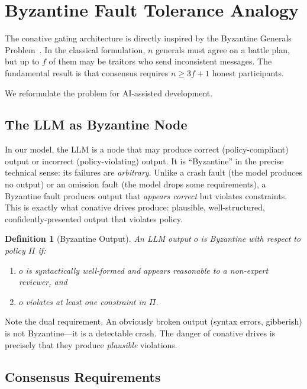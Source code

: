 \documentclass[11pt,a4paper]{article}
\newtheorem{definition}{Definition}[section]
\begin{document}
\section{Byzantine Fault Tolerance Analogy}
\label{sec:byzantine}

The conative gating architecture is directly inspired by the
Byzantine Generals Problem~\citep{lamport1982byzantine}.  In the
classical formulation, $n$ generals must agree on a battle plan,
but up to $f$ of them may be traitors who send inconsistent messages.
The fundamental result is that consensus requires $n \geq 3f + 1$
honest participants.

We reformulate the problem for AI-assisted development.

\subsection{The LLM as Byzantine Node}

In our model, the LLM is a node that may produce correct
(policy-compliant) output or incorrect (policy-violating) output.
It is ``Byzantine'' in the precise technical sense: its failures
are \emph{arbitrary}.  Unlike a crash fault (the model produces no
output) or an omission fault (the model drops some requirements),
a Byzantine fault produces output that \emph{appears correct} but
violates constraints.  This is exactly what conative drives produce:
plausible, well-structured, confidently-presented output that
violates policy.

\begin{definition}[Byzantine Output]
An LLM output $o$ is \emph{Byzantine} with respect to policy $\Pi$ if:
\begin{enumerate}
  \item $o$ is syntactically well-formed and appears reasonable to
        a non-expert reviewer, and
  \item $o$ violates at least one constraint in $\Pi$.
\end{enumerate}
\end{definition}

Note the dual requirement.  An obviously broken output (syntax errors,
gibberish) is not Byzantine---it is a detectable crash.  The danger
of conative drives is precisely that they produce \emph{plausible}
violations.

\subsection{Consensus Requirements}
\end{document}
